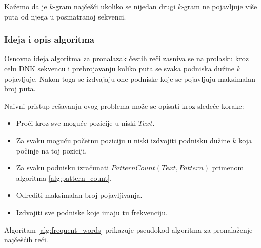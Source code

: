 \documentclass[12pt,oneside]{memoir}
\begin{document}
Kažemo da je $k$-gram najčešći ukoliko se nijedan drugi $k$-gram ne pojavljuje više puta od njega u posmatranoj sekvenci.



\subsubsection{Ideja i opis algoritma}

Osnovna ideja algoritma za pronalazak čestih reči zasniva se na prolasku kroz celu DNK sekvencu i prebrojavanju koliko puta se svaka podniska dužine $k$ pojavljuje. Nakon toga se izdvajaju one podniske koje se pojavljuju maksimalan broj puta.

Naivni pristup rešavanju ovog problema može se opisati kroz sledeće korake:
\begin{itemize}
    \item Proći kroz sve moguće pozicije u niski $Text$.
    \item Za svaku moguću početnu poziciju u niski izdvojiti podnisku dužine $k$ koja počinje na toj poziciji.
    \item Za svaku podnisku izračunati $\textit{PatternCount}(Text, Pattern)$ primenom algoritma \ref{alg:pattern_count}.
    \item Odrediti maksimalan broj pojavljivanja.
    \item Izdvojiti sve podniske koje imaju tu frekvenciju.
\end{itemize}

Algoritam \ref{alg:frequent_words} prikazuje pseudokod algoritma za pronalaženje najčešćih reči.

\begin{algorithm}[h]
\caption{Frequent Words}
\label{alg:frequent_words}
\SetAlgoLined
\DontPrintSemicolon
{}
\end{algorithm}
\end{document}
